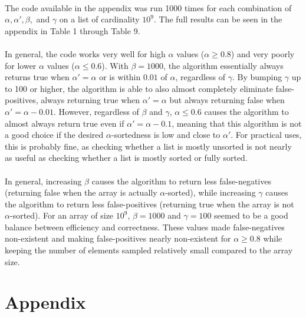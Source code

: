 \documentclass{article}
\begin{document}
\paragraph{}The code available in the appendix was run 1000 times for each combination of $\alpha, \alpha', \beta,$ and $\gamma$ on a list of cardinality $10^9$. The full results can be seen in the appendix in Table 1 through Table 9.
\paragraph{}In general, the code works very well for high $\alpha$ values ($\alpha \geq 0.8$) and very poorly for lower $\alpha$ values ($\alpha \leq 0.6$). With $\beta = 1000$, the algorithm essentially always returns true when $\alpha' = \alpha$ or is within $0.01$ of $\alpha$, regardless of $\gamma$.
By bumping $\gamma$ up to 100 or higher, the algorithm is able to also almost completely eliminate false-positives, always returning true when $\alpha'=\alpha$ but always returning false when $\alpha'=\alpha-0.01$.
However, regardless of $\beta$ and $\gamma$, $\alpha \leq 0.6$ causes the algorithm to almost always return true even if $\alpha' = \alpha - 0.1$, meaning that this algorithm is not a good choice if the desired $\alpha$-sortedness is low and close to $\alpha'$.
For practical uses, this is probably fine, as checking whether a list is mostly unsorted is not nearly as useful as checking whether a list is mostly sorted or fully sorted.
\paragraph{}In general, increasing $\beta$ causes the algorithm to return less false-negatives (returning false when the array is actually $\alpha$-sorted), while increasing $\gamma$ causes the algorithm to return less false-positives (returning true when the array is not $\alpha$-sorted). For an array of size $10^9$, $\beta=1000$ and $\gamma=100$ seemed to be a good balance between efficiency and correctness.
These values made false-negatives non-existent and making false-positives nearly non-existent for $\alpha \geq 0.8$ while keeping the number of elements sampled relatively small compared to the array size.
\section{Appendix}
\end{document}
